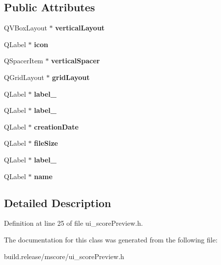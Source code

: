 \subsection*{Public Attributes}
\begin{DoxyCompactItemize}
\item 
\mbox{\label{class_ui___score_preview_a6fe55ad72f5c8563b877be9da5011dc3}} 
Q\+V\+Box\+Layout $\ast$ {\bfseries vertical\+Layout}
\item 
\mbox{\label{class_ui___score_preview_a0b2aed92f2acb8c8523d7bbf5ae177cc}} 
Q\+Label $\ast$ {\bfseries icon}
\item 
\mbox{\label{class_ui___score_preview_a3fdebc9e0ae5928c002f64483e5d7029}} 
Q\+Spacer\+Item $\ast$ {\bfseries vertical\+Spacer}
\item 
\mbox{\label{class_ui___score_preview_aa32354a6b157ff30e018185e443a1054}} 
Q\+Grid\+Layout $\ast$ {\bfseries grid\+Layout}
\item 
\mbox{\label{class_ui___score_preview_ab5a61261cee85e684ab86880feb3e214}} 
Q\+Label $\ast$ {\bfseries label\+\_}
\item 
\mbox{\label{class_ui___score_preview_a95c9b2a383db568d8e234f6cdafc5877}} 
Q\+Label $\ast$ {\bfseries label\+\_}
\item 
\mbox{\label{class_ui___score_preview_a888186926bf25e0f2bf185e2031dd1cd}} 
Q\+Label $\ast$ {\bfseries creation\+Date}
\item 
\mbox{\label{class_ui___score_preview_ae3308c74adba2b9ff9c1f53ee8127785}} 
Q\+Label $\ast$ {\bfseries file\+Size}
\item 
\mbox{\label{class_ui___score_preview_a00aea68f528dcd442828a846329ad6a7}} 
Q\+Label $\ast$ {\bfseries label\+\_}
\item 
\mbox{\label{class_ui___score_preview_abc7248bef4d7149c6b3deb9f3f81d217}} 
Q\+Label $\ast$ {\bfseries name}
\end{DoxyCompactItemize}


\subsection{Detailed Description}


Definition at line 25 of file ui\+\_\+score\+Preview.\+h.



The documentation for this class was generated from the following file\+:\begin{DoxyCompactItemize}
\item 
build.\+release/mscore/ui\+\_\+score\+Preview.\+h\end{DoxyCompactItemize}
